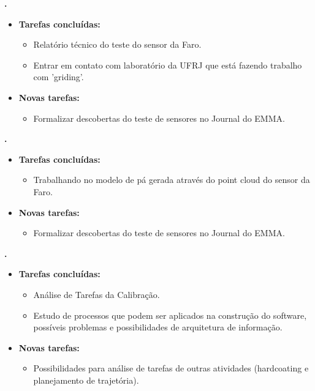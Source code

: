 	
	  \textbf{\elael.} 
	\begin{itemize}
		\item \textbf{Tarefas concluídas:}
			\begin{itemize}    
				\item Relatório técnico do teste do sensor da Faro.
				\item Entrar em contato com laboratório da UFRJ que está fazendo trabalho
				com 'griding'.
			\end{itemize}
		
		\item \textbf{Novas tarefas:}
			\begin{itemize} 
			    \item Formalizar descobertas do teste de sensores no Journal do EMMA.
			\end{itemize}
	\end{itemize}			
			
  \textbf{\renan.} 
	\begin{itemize}
		\item \textbf{Tarefas concluídas:}
			\begin{itemize}    
				\item Trabalhando no modelo de pá gerada através do point cloud do sensor da
				Faro.
			\end{itemize}
		
		\item \textbf{Novas tarefas:}
			\begin{itemize} 
			    \item Formalizar descobertas do teste de sensores no Journal do EMMA.
			\end{itemize}
	\end{itemize}	
			
   \textbf{\julia.} 
	\begin{itemize}
		\item \textbf{Tarefas concluídas:}
			\begin{itemize}    
				\item Análise de Tarefas da Calibração.
				\item Estudo de processos que podem ser aplicados na construção do software,
				possíveis problemas e possibilidades de arquitetura de informação.
			\end{itemize}
		
		\item \textbf{Novas tarefas:}
			\begin{itemize} 
			    \item Possibilidades para análise de tarefas de outras atividades
			    (hardcoating e planejamento de trajetória).
			\end{itemize}
	\end{itemize}		



